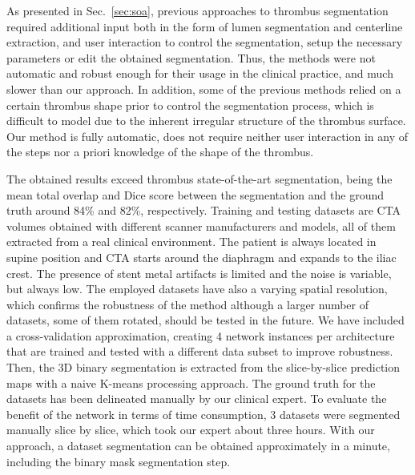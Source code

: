 \documentclass[preprint,authoryear,12pt]{elsarticle}
\begin{document}
As presented in Sec.~\ref{sec:soa}, previous approaches to thrombus segmentation required additional input both in the form of lumen segmentation and centerline extraction, and user interaction to control the segmentation, setup the necessary parameters or edit the obtained segmentation. Thus, the methods were not automatic and robust enough for their usage in the clinical practice, and much slower than our approach. In addition, some of the previous methods relied on a certain thrombus shape prior to control the segmentation process, which is difficult to model due to the inherent irregular structure of the thrombus surface. Our method is fully automatic, does not require neither user interaction in any of the steps nor a priori knowledge of the shape of the thrombus. 

The obtained results exceed thrombus state-of-the-art segmentation, being the mean total overlap and Dice score between the segmentation and the ground truth around 84\% and 82\%, respectively. Training and testing datasets are CTA volumes obtained with different scanner manufacturers and models, all of them extracted from a real clinical environment. The patient is always located in supine position and CTA starts around the diaphragm and expands to the iliac crest. The presence of stent metal artifacts is limited and the noise is variable, but always low. The employed datasets have also a varying spatial resolution, which confirms the robustness of the method although a larger number of datasets, some of them rotated, should be tested in the future.
We have included a cross-validation approximation, creating 4 network instances per architecture that are trained and tested with a different data subset to improve robustness. Then, the 3D binary segmentation is extracted from the slice-by-slice prediction maps with a naive K-means processing approach. The ground truth for the datasets has been delineated manually by our clinical expert. To evaluate the benefit of the network in terms of time consumption, 3 datasets were segmented manually slice by slice, which took our expert about three hours. With our approach, a dataset segmentation can be obtained approximately in a minute, including the binary mask segmentation step. %
\par
\end{document}
